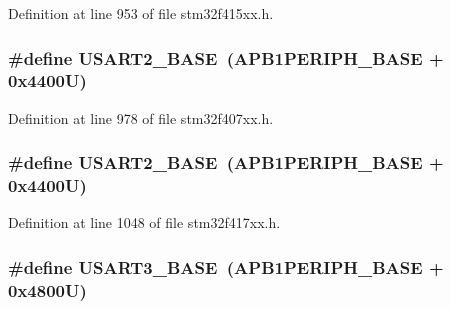 Definition at line 953 of file stm32f415xx.\+h.

\subsubsection[{\texorpdfstring{U\+S\+A\+R\+T2\+\_\+\+B\+A\+SE}{USART2_BASE}}]{\setlength{\rightskip}{0pt plus 5cm}\#define U\+S\+A\+R\+T2\+\_\+\+B\+A\+SE~({\bf A\+P\+B1\+P\+E\+R\+I\+P\+H\+\_\+\+B\+A\+SE} + 0x4400\+U)}\hypertarget{group___peripheral__registers__structures_gade83162a04bca0b15b39018a8e8ec090}{}\label{group___peripheral__registers__structures_gade83162a04bca0b15b39018a8e8ec090}


Definition at line 978 of file stm32f407xx.\+h.

\subsubsection[{\texorpdfstring{U\+S\+A\+R\+T2\+\_\+\+B\+A\+SE}{USART2_BASE}}]{\setlength{\rightskip}{0pt plus 5cm}\#define U\+S\+A\+R\+T2\+\_\+\+B\+A\+SE~({\bf A\+P\+B1\+P\+E\+R\+I\+P\+H\+\_\+\+B\+A\+SE} + 0x4400\+U)}\hypertarget{group___peripheral__registers__structures_gade83162a04bca0b15b39018a8e8ec090}{}\label{group___peripheral__registers__structures_gade83162a04bca0b15b39018a8e8ec090}


Definition at line 1048 of file stm32f417xx.\+h.

\subsubsection[{\texorpdfstring{U\+S\+A\+R\+T3\+\_\+\+B\+A\+SE}{USART3_BASE}}]{\setlength{\rightskip}{0pt plus 5cm}\#define U\+S\+A\+R\+T3\+\_\+\+B\+A\+SE~({\bf A\+P\+B1\+P\+E\+R\+I\+P\+H\+\_\+\+B\+A\+SE} + 0x4800\+U)}\hypertarget{group___peripheral__registers__structures_gabe0d6539ac0026d598274ee7f45b0251}{}\label{group___peripheral__registers__structures_gabe0d6539ac0026d598274ee7f45b0251}


